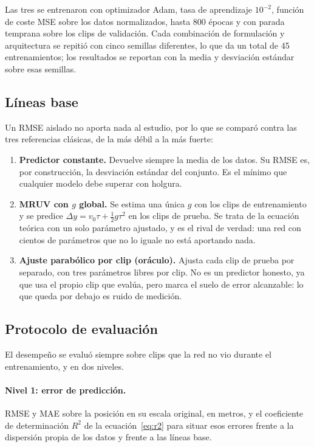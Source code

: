 \documentclass[titlepage,11pt]{article}
\begin{document}
Las tres se entrenaron con optimizador Adam, tasa de aprendizaje $10^{-2}$,
función de coste MSE sobre los datos normalizados, hasta 800 épocas y con
parada temprana sobre los clips de validación. Cada combinación de formulación
y arquitectura se repitió con cinco semillas diferentes, lo que da un total
de 45 entrenamientos; los resultados se reportan con la media y
desviación estándar sobre esas semillas.

\subsection{Líneas base}
\label{subsec:baselines}

Un RMSE aislado no aporta nada al estudio, por lo que se comparó contra las tres
referencias clásicas, de la más débil a la más fuerte:

\begin{enumerate}
\item \textbf{Predictor constante.} Devuelve siempre la media de los datos. Su
  RMSE es, por construcción, la desviación estándar del conjunto. Es el mínimo
  que cualquier modelo debe superar con holgura.
\item \textbf{MRUV con $g$ global.} Se estima una única $g$ con los clips de
  entrenamiento y se predice $\Delta y = v_0\tau+\tfrac{1}{2}g\tau^2$ en los
  clips de prueba. Se trata de la ecuación teórica con un solo parámetro
  ajustado, y es el rival de verdad: una red con cientos de parámetros que no
  lo iguale no está aportando nada.
\item \textbf{Ajuste parabólico por clip (oráculo).} Ajusta cada clip de prueba
  por separado, con tres parámetros libres por clip. No es un predictor
  honesto, ya que usa el propio clip que evalúa, pero marca el suelo de error
  alcanzable: lo que queda por debajo es ruido de medición.
\end{enumerate}

\subsection{Protocolo de evaluación}
\label{sec:protocolo}

El desempeño se evaluó siempre sobre clips que la red no vio durante el
entrenamiento, y en dos niveles.

\paragraph{Nivel 1: error de predicción.} RMSE y MAE sobre la posición
en su escala original, en metros, y el coeficiente de determinación $R^2$ de la
ecuación~\eqref{eq:r2} para situar esos errores frente a la dispersión propia
de los datos y frente a las líneas base.
\end{document}
